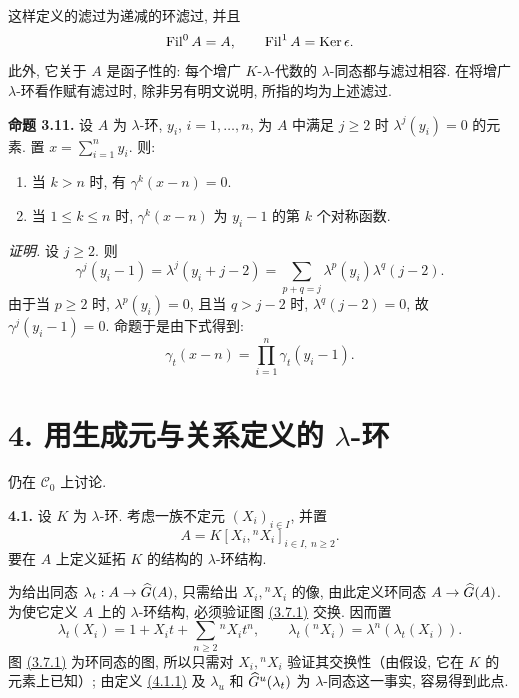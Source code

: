 这样定义的滤过为递减的环滤过, 并且
\[
  \operatorname{Fil}^0A=A,
  \qquad \operatorname{Fil}^1A=\operatorname{Ker}\epsilon.
\]
此外, 它关于 \(A\) 是函子性的: 每个增广 \(K\)-\(\lambda\)-代数的 \(\lambda\)-同态都与滤过相容. 在将增广 \(\lambda\)-环看作赋有滤过时, 除非另有明文说明, 所指的均为上述滤过.

\textbf{命题 3.11.} 设 \(A\) 为 \(\lambda\)-环, \(y_i\), \(i=1,\ldots,n\), 为 \(A\) 中满足 \(j\ge2\) 时 \(\lambda^j(y_i)=0\) 的元素. 置 \(x=\sum_{i=1}^n y_i\). 则:
\begin{enumerate}[label=\roman*)]
\item 当 \(k>n\) 时, 有 \(\gamma^k(x-n)=0\).
\item 当 \(1\le k\le n\) 时, \(\gamma^k(x-n)\) 为 \(y_i-1\) 的第 \(k\) 个对称函数.
\end{enumerate}

\emph{证明.} 设 \(j\ge2\). 则
\[
 \gamma^j(y_i-1)=\lambda^j(y_i+j-2)
   =\sum_{p+q=j}\lambda^p(y_i)\lambda^q(j-2).
\]
由于当 \(p\ge2\) 时, \(\lambda^p(y_i)=0\), 且当 \(q>j-2\) 时, \(\lambda^q(j-2)=0\), 故 \(\gamma^j(y_i-1)=0\). 命题于是由下式得到:
\[
 \gamma_t(x-n)=\prod_{i=1}^n\gamma_t(y_i-1).
\]

\section*{4. 用生成元与关系定义的 \(\lambda\)-环}

仍在 \(\mathcal C_0\) 上讨论.

\textbf{4.1.} 设 \(K\) 为 \(\lambda\)-环. 考虑一族不定元 \((X_i)_{i\in I}\), 并置
\[
 A=K[X_i,{}^nX_i]_{i\in I,\ n\ge2}.
\]
要在 \(A\) 上定义延拓 \(K\) 的结构的 \(\lambda\)-环结构.

为给出同态 \(\lambda_t:A\to\widehat G(A)\), 只需给出 \(X_i,{}^nX_i\) 的像, 由此定义环同态 \(A\to\widehat G(A)\). 为使它定义 \(A\) 上的 \(\lambda\)-环结构, 必须验证图 \hyperlink{sga6.e05.eq.3-7-1}{(3.7.1)} 交换. 因而置
\begin{equation}\tag{4.1.1}
 \lambda_t(X_i)=1+X_it+\sum_{n\ge2}{}^nX_i t^n,
 \qquad
 \lambda_t({}^nX_i)=\lambda^n(\lambda_t(X_i)).
\end{equation}
图 \hyperlink{sga6.e05.eq.3-7-1}{(3.7.1)} 为环同态的图, 所以只需对 \(X_i,{}^nX_i\) 验证其交换性（由假设, 它在 \(K\) 的元素上已知）; 由定义 \hyperlink{sga6.e05.eq.4-1-1}{(4.1.1)} 及 \(\lambda_u\) 和 \(\widehat G^u(\lambda_t)\) 为 \(\lambda\)-同态这一事实, 容易得到此点.

